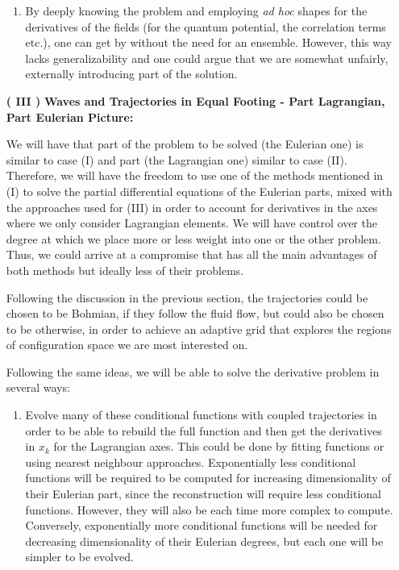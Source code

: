 \documentclass[11pt, a4paper]{article} %
\begin{document}
\begin{enumerate}
\begin{enumerate}
\item By deeply knowing the problem and employing {\em ad hoc} shapes for the derivatives of the fields (for the quantum potential, the correlation terms etc.), one can get by without the need for an ensemble. However, this way lacks generalizability and one could argue that we are somewhat unfairly, externally introducing part of the solution.\vspace{0.2cm}
\end{enumerate}


\item [\bf ( III )] {\bf Waves and Trajectories in Equal Footing - Part Lagrangian, Part Eulerian Picture:}\vspace{0.15cm}

We will have that part of the problem to be solved (the Eulerian one) is similar to case (I) and part (the Lagrangian one) similar to case (II). Therefore, we will have the freedom to use one of the methods mentioned in (I) to solve the partial differential equations of the Eulerian parts, mixed with the approaches used for (III) in order to account for derivatives in the axes where we only consider Lagrangian elements. We will have control over the degree at which we place more or less weight into one or the other problem. Thus, we could arrive at a compromise that has all the main advantages of both methods but ideally less of their problems.

Following the discussion in the previous section, the trajectories could be chosen to be Bohmian, if they follow the fluid flow, but could also be chosen to be otherwise, in order to achieve an adaptive grid that explores the regions of configuration space we are most interested on.

Following the same ideas, we will be able to solve the derivative problem in several ways:
\begin{enumerate}
\item Evolve many of these conditional functions with coupled trajectories in order to be able to rebuild the full function and then get the derivatives in $x_k$ for the Lagrangian axes. This could be done by fitting functions or using nearest neighbour approaches. Exponentially less conditional functions will be required to be computed for increasing dimensionality of their Eulerian part, since the reconstruction will require less conditional functions. However, they will also be each time more complex to compute. Conversely, exponentially more conditional functions will be needed for decreasing dimensionality of their Eulerian degrees, but each one will be simpler to be evolved.


\end{enumerate}
\end{enumerate}
\end{document}
